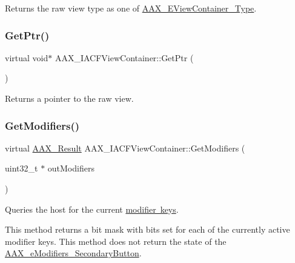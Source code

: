 Returns the raw view type as one of \mbox{\hyperlink{a00503_ab4c36de253fc80b541eb51074c64caef}{A\+A\+X\+\_\+\+E\+View\+Container\+\_\+\+Type}}. 

\mbox{\label{a01765_a180a3f3407999231d78d437243c70506}} 
\subsubsection{\texorpdfstring{GetPtr()}{GetPtr()}}
{\footnotesize\ttfamily virtual void$\ast$ A\+A\+X\+\_\+\+I\+A\+C\+F\+View\+Container\+::\+Get\+Ptr (\begin{DoxyParamCaption}{ }\end{DoxyParamCaption})\hspace{0.3cm}{\ttfamily [pure virtual]}}



Returns a pointer to the raw view. 

\mbox{\label{a01765_a2dcb6da5a296c9b5d9f67c40880606f1}} 
\subsubsection{\texorpdfstring{GetModifiers()}{GetModifiers()}}
{\footnotesize\ttfamily virtual \mbox{\hyperlink{a00392_a4d8f69a697df7f70c3a8e9b8ee130d2f}{A\+A\+X\+\_\+\+Result}} A\+A\+X\+\_\+\+I\+A\+C\+F\+View\+Container\+::\+Get\+Modifiers (\begin{DoxyParamCaption}\item[{uint32\+\_\+t $\ast$}]{out\+Modifiers }\end{DoxyParamCaption})\hspace{0.3cm}{\ttfamily [pure virtual]}}



Queries the host for the current \mbox{\hyperlink{a00491_a47756e0a56d00468b7045eb26500cb78}{modifier keys}}. 

This method returns a bit mask with bits set for each of the currently active modifier keys. This method does not return the state of the \mbox{\hyperlink{a00491_a47756e0a56d00468b7045eb26500cb78a6d7914ad68992fa2670fc0327704cbb7}{A\+A\+X\+\_\+e\+Modifiers\+\_\+\+Secondary\+Button}}.

